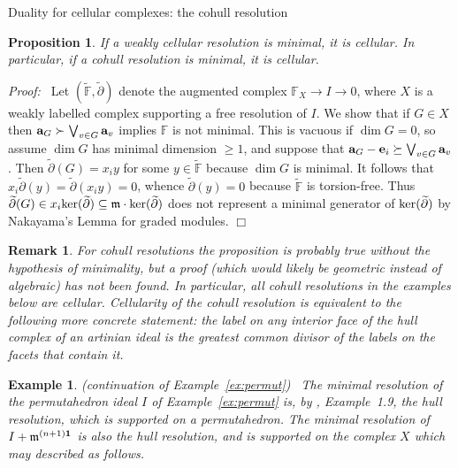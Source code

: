 \documentclass[12pt,leqno]{article}
\newtheorem{prop}[thm]{Proposition}
\newtheorem{example}[thm]{Example}
\newtheorem{remark}[thm]{Remark}
\def\aa{{{\rm \bf a}}}
\def\ee{{{\rm \bf e}}}
\def\mm{{\mathfrak m}}
\def\FF{{\mathbb F}}
\begin{document}
\begin{section}{Duality for cellular complexes: the cohull resolution}
\begin{prop} \label{prop:minimal}
If a weakly cellular resolution is minimal, it is cellular.  In
particular, if a cohull resolution is minimal, it is cellular.
\end{prop}
{\it Proof:\ } Let $(\widetilde{\FF},\widetilde{\partial})$ denote the
augmented complex $\FF_X \to I \to 0$, where $X$ is a weakly labelled
complex supporting a free resolution of $I$.  We show that if $G \in X$
then $\aa_G \succ \bigvee_{v \in G} \aa_v$ implies $\FF$ is not minimal.
This is vacuous if $\dim G = 0$, so assume $\dim G$ has minimal dimension
$\geq 1$, and suppose that $\aa_G - \ee_i \succeq \bigvee_{v \in G}
\aa_v$.  Then $\widetilde{\partial}(G) = x_iy$ for some $y \in
\widetilde{\FF}$ because $\dim G$ is minimal.  It follows that
$x_i\widetilde{\partial}(y) = \widetilde{\partial}(x_iy) = 0$, whence
$\widetilde{\partial}(y) = 0$ because $\widetilde{\FF}$ is torsion-free.
Thus $\widetilde{\partial}(G) \in x_i{\rm ker}(\widetilde{\partial})
\subseteq \mm \cdot {\rm ker}(\widetilde {\partial})$ does not represent
a minimal generator of ${\rm ker}(\widetilde{\partial})$ by Nakayama's
Lemma for graded modules.
\hfill
$\Box$
\vskip 2mm

\noindent
\begin{remark} \rm
For cohull resolutions the proposition is probably true without the
hypothesis of minimality, but a proof (which would likely be geometric
instead of algebraic) has not been found.  In particular, all cohull
resolutions in the examples below are cellular.  Cellularity of the
cohull resolution is equivalent to the following more concrete statement:
the label on any interior face of the hull complex of an artinian ideal
is the greatest common divisor of the labels on the facets that contain
it.
\end{remark}

\begin{example} \label{ex:permut3} \rm
{\sl (continuation of Example~\ref{ex:permut})\ } The minimal resolution
of the permutahedron ideal $I$ of Example~\ref{ex:permut} is, by
\cite{BS}, Example~1.9, the hull resolution, which is supported on a
permutahedron.  The minimal resolution of $I + \mm^{(n+1){\bf 1}}$ is
also the hull resolution, and is supported on the complex $X$ which may
described as follows.


\end{example}
\end{section}
\end{document}
